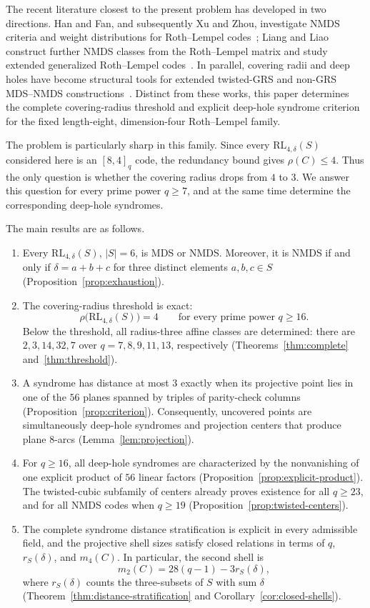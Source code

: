 ﻿\documentclass[11pt]{article}
\newcommand{\RL}{\mathrm{RL}}
\theoremstyle{plain}
\theoremstyle{definition}
\begin{document}
The recent literature closest to the present problem has developed in two
directions.  Han and Fan, and subsequently Xu and Zhou, investigate NMDS
criteria and weight distributions for Roth--Lempel
codes~\cite{HanFan2023,XuZhou2026}; Liang and Liao construct further NMDS
classes from the Roth--Lempel matrix and study extended generalized
Roth--Lempel codes~\cite{LiangLiao2026,LiangLiaoDM2026}.  In parallel,
covering radii and deep holes have become structural tools for extended
twisted-GRS and non-GRS MDS--NMDS
constructions~\cite{LiZhuSun2025,LiLuLingLam2026}.  Distinct from these works,
this paper determines the complete covering-radius threshold and explicit
deep-hole syndrome criterion for the fixed length-eight, dimension-four
Roth--Lempel family.

The problem is particularly sharp in this family.  Since every
\(\RL_{4,\delta}(S)\) considered here is an \([8,4]_q\) code, the redundancy
bound gives \(\rho(C)\le4\).  Thus the only question is whether the covering
radius drops from \(4\) to \(3\).  We answer this question for every prime
power \(q\ge7\), and at the same time determine the corresponding deep-hole
syndromes.

The main results are as follows.
\begin{enumerate}
\item Every \(\RL_{4,\delta}(S)\), \(|S|=6\), is MDS or NMDS\@.  Moreover,
it is NMDS if and only if
\(\delta=a+b+c\) for three distinct elements \(a,b,c\in S\)
(Proposition~\ref{prop:exhaustion}).
\item The covering-radius threshold is exact:
\[
 \rho\bigl(\RL_{4,\delta}(S)\bigr)=4
 \qquad\text{for every prime power }q\ge16.
\]
Below the threshold, all radius-three affine classes are determined:
there are \(2,3,14,32,7\) over \(q=7,8,9,11,13\), respectively
(Theorems~\ref{thm:complete} and~\ref{thm:threshold}).
\item A syndrome has distance at most \(3\) exactly when its projective point
lies in one of the \(56\) planes spanned by triples of parity-check columns
(Proposition~\ref{prop:criterion}).  Consequently, uncovered points are
simultaneously deep-hole syndromes and projection centers that produce plane
\(8\)-arcs (Lemma~\ref{lem:projection}).
\item For \(q\ge16\), all deep-hole syndromes are characterized by the
nonvanishing of one explicit product of \(56\) linear factors
(Proposition~\ref{prop:explicit-product}).  The twisted-cubic subfamily of
centers already proves existence for all \(q\ge23\), and for all NMDS codes
when \(q\ge19\) (Proposition~\ref{prop:twisted-centers}).
\item The complete syndrome distance stratification is explicit in every
admissible field, and the projective shell sizes satisfy closed relations in
terms of \(q\), \(r_S(\delta)\), and \(m_4(C)\).  In particular, the second
shell is
\[
 m_2(C)=28(q-1)-3r_S(\delta),
\]
where \(r_S(\delta)\) counts the three-subsets of \(S\) with sum \(\delta\)
(Theorem~\ref{thm:distance-stratification} and
Corollary~\ref{cor:closed-shells}).
\end{enumerate}
\end{document}
